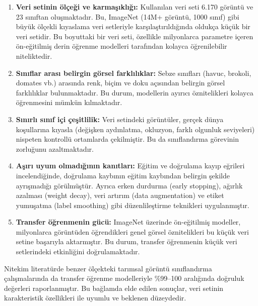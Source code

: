 \documentclass[conference]{IEEEtran}
\begin{document}
\begin{enumerate}
    \item \textbf{Veri setinin \"{o}l\c{c}e\u{g}i ve karma\c{s}{\i}kl{\i}\u{g}{\i}:} Kullan{\i}lan veri seti 6.170 g\"{o}r\"{u}nt\"{u} ve 23 s{\i}n{\i}ftan olu\c{s}maktad{\i}r. Bu, ImageNet (14M+ g\"{o}r\"{u}nt\"{u}, 1000 s{\i}n{\i}f) gibi b\"{u}y\"{u}k \"{o}l\c{c}ekli k{\i}yaslama veri setleriyle kar\c{s}{\i}la\c{s}t{\i}r{\i}ld{\i}\u{g}{\i}nda olduk\c{c}a k\"{u}\c{c}\"{u}k bir veri setidir. Bu boyuttaki bir veri seti, \"{o}zellikle milyonlarca parametre i\c{c}eren \"{o}n-e\u{g}itilmi\c{s} derin \"{o}\u{g}renme modelleri taraf{\i}ndan kolayca \"{o}\u{g}renilebilir niteliktedir.
    \item \textbf{S{\i}n{\i}flar aras{\i} belirgin g\"{o}rsel farkl{\i}l{\i}klar:} Sebze s{\i}n{\i}flar{\i} (havuc, brokoli, domates vb.) aras{\i}nda renk, bi\c{c}im ve doku a\c{c}{\i}s{\i}ndan belirgin g\"{o}rsel farkl{\i}l{\i}klar bulunmaktad{\i}r. Bu durum, modellerin ay{\i}r{\i}c{\i} \"{o}znitelikleri kolayca \"{o}\u{g}renmesini m\"{u}mk\"{u}n k{\i}lmaktad{\i}r.
    \item \textbf{S{\i}n{\i}rl{\i} s{\i}n{\i}f i\c{c}i \c{c}e\c{s}itlilik:} Veri setindeki g\"{o}r\"{u}nt\"{u}ler, ger\c{c}ek d\"{u}nya ko\c{s}ullar{\i}na k{\i}yasla (de\u{g}i\c{s}ken ayd{\i}nlatma, okluzyon, farkl{\i} olgunluk seviyeleri) nispeten kontroll\"{u} ortamlarda \c{c}ekilmi\c{s}tir. Bu da s{\i}n{\i}fland{\i}rma g\"{o}revinin zorlu\u{g}unu azaltmaktad{\i}r.
    \item \textbf{A\c{s}{\i}r{\i} uyum olmad{\i}\u{g}{\i}n{\i}n kan{\i}tlar{\i}:} E\u{g}itim ve do\u{g}rulama kay{\i}p e\u{g}rileri incelendi\u{g}inde, do\u{g}rulama kayb{\i}n{\i}n e\u{g}itim kayb{\i}ndan belirgin \c{s}ekilde ayr{\i}\c{s}mad{\i}\u{g}{\i} g\"{o}r\"{u}lm\"{u}\c{s}t\"{u}r. Ayr{\i}ca erken durdurma (early stopping), a\u{g}{\i}rl{\i}k azalmas{\i} (weight decay), veri art{\i}r{\i}m (data augmentation) ve etiket yumu\c{s}atma (label smoothing) gibi d\"{u}zenlile\c{s}tirme teknikleri uygulanm{\i}\c{s}t{\i}r.
    \item \textbf{Transfer \"{o}\u{g}renmenin g\"{u}c\"{u}:} ImageNet \"{u}zerinde \"{o}n-e\u{g}itilmi\c{s} modeller, milyonlarca g\"{o}r\"{u}nt\"{u}den \"{o}\u{g}rendikleri genel g\"{o}rsel \"{o}znitelikleri bu k\"{u}\c{c}\"{u}k veri setine ba\c{s}ar{\i}yla aktarm{\i}\c{s}t{\i}r. Bu durum, transfer \"{o}\u{g}renmenin k\"{u}\c{c}\"{u}k veri setlerindeki etkinli\u{g}ini do\u{g}rulamaktad{\i}r.
\end{enumerate}

Nitekim literat\"{u}rde benzer \"{o}l\c{c}ekteki tar{\i}msal g\"{o}r\"{u}nt\"{u} s{\i}n{\i}fland{\i}rma \c{c}al{\i}\c{s}malar{\i}nda da transfer \"{o}\u{g}renme modelleriyle \%99--100 aral{\i}\u{g}{\i}nda do\u{g}ruluk de\u{g}erleri raporlanm{\i}\c{s}t{\i}r. Bu ba\u{g}lamda elde edilen sonu\c{c}lar, veri setinin karakteristik \"{o}zellikleri ile uyumlu ve beklenen d\"{u}zeydedir.
\end{document}
